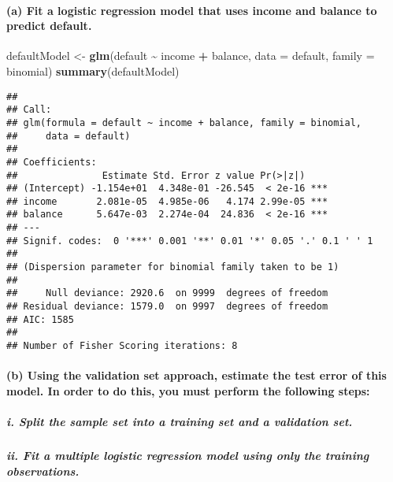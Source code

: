 \documentclass[
]{article}
\newenvironment{Shaded}{\begin{snugshade}}{\end{snugshade}}
\newcommand{\AttributeTok}[1]{\textcolor[rgb]{0.13,0.29,0.53}{#1}}
\newcommand{\FunctionTok}[1]{\textcolor[rgb]{0.13,0.29,0.53}{\textbf{#1}}}
\newcommand{\NormalTok}[1]{#1}
\newcommand{\OtherTok}[1]{\textcolor[rgb]{0.56,0.35,0.01}{#1}}
\newcommand{\SpecialCharTok}[1]{\textcolor[rgb]{0.81,0.36,0.00}{\textbf{#1}}}
\begin{document}
\paragraph{(a) Fit a logistic regression model that uses income and
balance to predict
default.}\label{a-fit-a-logistic-regression-model-that-uses-income-and-balance-to-predict-default.}

\begin{Shaded}
\begin{Highlighting}[]
\NormalTok{defaultModel }\OtherTok{\textless{}{-}} \FunctionTok{glm}\NormalTok{(default }\SpecialCharTok{\textasciitilde{}}\NormalTok{ income }\SpecialCharTok{+}\NormalTok{ balance, }\AttributeTok{data =}\NormalTok{ default, }\AttributeTok{family =}\NormalTok{ binomial)}
\FunctionTok{summary}\NormalTok{(defaultModel)}
\end{Highlighting}
\end{Shaded}

\begin{verbatim}
## 
## Call:
## glm(formula = default ~ income + balance, family = binomial, 
##     data = default)
## 
## Coefficients:
##               Estimate Std. Error z value Pr(>|z|)    
## (Intercept) -1.154e+01  4.348e-01 -26.545  < 2e-16 ***
## income       2.081e-05  4.985e-06   4.174 2.99e-05 ***
## balance      5.647e-03  2.274e-04  24.836  < 2e-16 ***
## ---
## Signif. codes:  0 '***' 0.001 '**' 0.01 '*' 0.05 '.' 0.1 ' ' 1
## 
## (Dispersion parameter for binomial family taken to be 1)
## 
##     Null deviance: 2920.6  on 9999  degrees of freedom
## Residual deviance: 1579.0  on 9997  degrees of freedom
## AIC: 1585
## 
## Number of Fisher Scoring iterations: 8
\end{verbatim}

\paragraph{(b) Using the validation set approach, estimate the test
error of this model. In order to do this, you must perform the following
steps:}\label{b-using-the-validation-set-approach-estimate-the-test-error-of-this-model.-in-order-to-do-this-you-must-perform-the-following-steps}

\subparagraph{i. Split the sample set into a training set and a
validation
set.}\label{i.-split-the-sample-set-into-a-training-set-and-a-validation-set.}

\subparagraph{ii. Fit a multiple logistic regression model using only
the training
observations.}\label{ii.-fit-a-multiple-logistic-regression-model-using-only-the-training-observations.}
\end{document}
